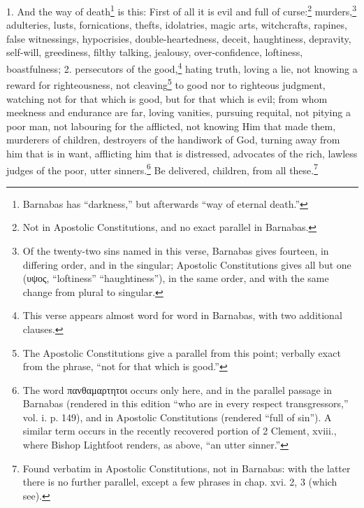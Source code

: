 1. And the way of death\footnote{\par  Barnabas has “darkness,” but afterwards “way of eternal death.”} is this: First of all it is evil and full of curse:\footnote{\par  Not in Apostolic Constitutions, and no exact parallel in Barnabas.} murders,\footnote{\par  Of the twenty-two sins named in this verse, Barnabas gives fourteen, in differing order, and in the singular; Apostolic Constitutions gives all but one (\textgreek{υψος}, “loftiness” “haughtiness”), in the same order, and with the same change from plural to singular.} adulteries, lusts, fornications, thefts, idolatries, magic arts, witchcrafts, rapines, false witnessings, hypocrisies, double-heartedness, deceit, haughtiness, depravity, self-will, greediness, filthy talking, jealousy, over-confidence, loftiness, boastfulness; 2. persecutors of the good,\footnote{\par  This verse appears almost word for word in Barnabas, with two additional clauses.} hating truth, loving a lie, not knowing a reward for righteousness, not cleaving\footnote{\par  The Apostolic Constitutions give a parallel from this point; verbally exact from the phrase, “not for that which is good.”} to good nor to righteous judgment, watching not for that which is good, but for that which is evil; from whom meekness and endurance are far, loving vanities, pursuing requital, not pitying a poor man, not labouring for the afflicted, not knowing Him that made them, murderers of children, destroyers of the handiwork of God, turning away from him that is in want, afflicting him that is distressed, advocates of the rich, lawless judges of the poor, utter sinners.\footnote{\par  The word \textgreek{πανθαμαρτητοι} occurs only here, and in the parallel passage in Barnabas (rendered in this edition “who are in every respect transgressors,” vol. i. p. 149), and in Apostolic Constitutions (rendered “full of sin”). A similar term occurs in the recently recovered portion of 2 Clement, xviii., where Bishop Lightfoot renders, as above, “an utter sinner.”} Be delivered, children, from all these.\footnote{\par  Found verbatim in Apostolic Constitutions, not in Barnabas: with the latter there is no further parallel, except a few phrases in chap. xvi. 2, 3 (which see).}


